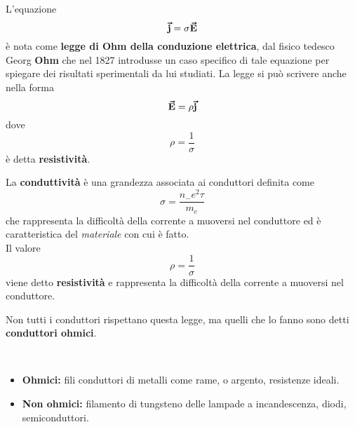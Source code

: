 L'equazione
\begin{equation}
	\vb*{\va{j}}=\sigma\vb*{\va{E}}
\end{equation}
è nota come \textbf{legge di Ohm della conduzione elettrica}, dal fisico tedesco Georg \textbf{Ohm} che nel 1827 introdusse un caso specifico di tale equazione per spiegare dei risultati sperimentali da lui studiati. La legge si può scrivere anche nella forma
\begin{equation}
	\vb*{\va{E}}=\rho\vb*{\va{j}}
\end{equation}
dove
\begin{equation*}
	\rho=\frac{1}{\sigma}
\end{equation*}
è detta \textbf{resistività}.
\begin{define}
	La \textbf{conduttività} è una grandezza associata ai conduttori definita come
	\begin{equation}
		\sigma=\frac{n_{-}e^2\tau}{m_{e}}
	\end{equation}
	che rappresenta la difficoltà della corrente a muoversi nel conduttore ed è caratteristica del \textit{materiale} con cui è fatto.\\
	Il valore
	\begin{equation}
		\rho=\frac{1}{\sigma}
	\end{equation}
	viene detto \textbf{resistività} e rappresenta la difficoltà della corrente a muoversi nel conduttore.
\end{define}
Non tutti i conduttori rispettano questa legge, ma quelli che lo fanno sono detti \textbf{conduttori ohmici}.
\begin{examplewt}~
	\begin{itemize}
		\item \textbf{Ohmici:} fili conduttori di metalli come rame, o argento, resistenze ideali.
		\item \textbf{Non ohmici:} filamento di tungsteno delle lampade a incandescenza, diodi, semiconduttori.
	\end{itemize}
\end{examplewt}
